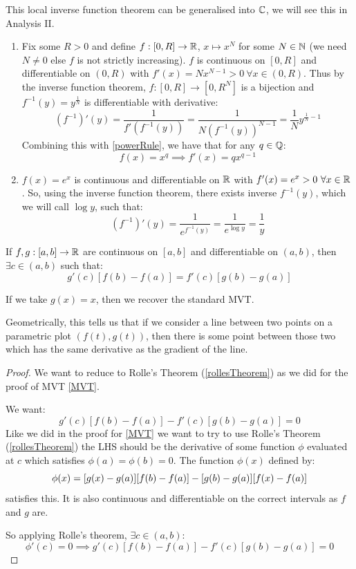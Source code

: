 \documentclass[../main.tex]{subfiles}
\begin{document}
\begin{remark}
  This local inverse function theorem can be generalised into $\mathbb{C}$, we will see this in Analysis II.
\end{remark}
\begin{example}
  \label{smoothRational}
  \begin{enumerate}
    \item Fix some $R > 0$ and define $f: [0, R] \to \mathbb{R}$, $x \mapsto x^{N}$ for some $N \in \mathbb{N}$ (we need $N \neq 0$ else $f$ is not strictly increasing).
      $f$ is continuous on $[0, R]$ and differentiable on $(0, R)$ with $f'(x) = N x^{N - 1} > 0\ \forall x \in (0, R)$.
      Thus by the inverse function theorem, $f: [0, R] \to [0, R^{N}]$ is a bijection and $f^{-1}(y) = y^{\frac{1}{N}}$ is differentiable with derivative:
      \[
        (f^{-1})'(y) =  \frac{1}{f'(f^{-1}(y))} = \frac{1}{N(f^{-1}(y))^{N - 1}} = \frac{1}{N}y^{\frac{1}{N} - 1}
      \]
      Combining this with \cref{powerRule}, we have that for any $q \in \mathbb{Q}$:
      \[
        f(x) = x^{q} \implies f'(x) = qx^{q - 1}
      \]
    \item $f(x) = e^{x}$ is continuous and differentiable on $\mathbb{R}$ with $f'(x) =  e^{x} > 0\ \forall x \in \mathbb{R}$.
      So, using the inverse function theorem, there exists inverse $f^{-1}(y)$, which we will call $\log y$, such that:
      \[
        (f^{-1})'(y) = \frac{1}{e^{f^{-1}(y)}} = \frac{1}{e^{\log y}} = \frac{1}{y}
      \]
  \end{enumerate}
\end{example}
\begin{proposition}
  If $f, g: [a, b] \to \mathbb{R}$ are continuous on $[a, b]$ and differentiable on $(a, b)$, then $\exists c \in (a, b)$ such that: \label{cauchyMVT}
  \[
    g'(c)[f(b) - f(a)] = f'(c)[g(b) - g(a)]
  \]
\end{proposition}
\begin{remark}
  If we take $g(x) = x$, then we recover the standard MVT.

  Geometrically, this tells us that if we consider a line between two points on a parametric plot $(f(t), g(t))$, then there is some point between those two which has the same derivative as the gradient of the line.
\end{remark}
\begin{proof}
  We want to reduce to Rolle's Theorem (\cref{rollesTheorem}) as we did for the proof of MVT \cref{MVT}.

  We want:
  \[
    g'(c)[f(b) - f(a)] - f'(c)[g(b) - g(a)] = 0
  \]
  Like we did in the proof for \cref{MVT} we want to try to use Rolle's Theorem (\cref{rollesTheorem}) the LHS should be the derivative of some function $\phi$ evaluated at $c$ which satisfies $\phi(a) = \phi(b) = 0$.
  The function $\phi(x)$ defined by:
  \[
    \phi(x) = [g(x) - g(a)][f(b) - f(a)] - [g(b) - g(a)][f(x) - f(a)] \\
  \]
  satisfies this.
  It is also continuous and differentiable on the correct intervals as $f$ and $g$ are.

  So applying Rolle's theorem, $\exists c \in (a, b)$:
  \[
    \phi'(c) = 0 \implies g'(c)[f(b) - f(a)] - f'(c)[g(b) - g(a)] = 0
  \]
\end{proof}
\end{document}
